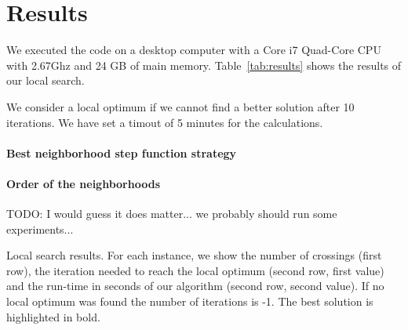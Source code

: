 \documentclass{scrartcl}
\begin{document}


\section{Results}

We executed the code on a desktop computer with a Core i7 Quad-Core
CPU with 2.67Ghz and 24 GB of main memory. Table~\ref{tab:results}
shows the results of our local search. 

We consider a local optimum if we cannot find a better solution after 10 iterations.
We have set a timout of 5 minutes for the calculations.

\paragraph{Best neighborhood step function strategy}






\paragraph{Order of the neighborhoods}

TODO: I would guess it does matter... we probably should run some experiments...









\begin{landscape}
\begin{table}
  \scriptsize
  
\caption{Local search results. For each instance, we show the number
  of crossings (first row), the iteration needed to reach the local
  optimum (second row, first value) and the run-time in seconds of our
  algorithm (second row, second value).  If no local optimum was found
  the number of iterations is -1. The best solution is highlighted in
  bold.}
\label{tab:results}
\end{table}
\end{landscape}
\end{document}
